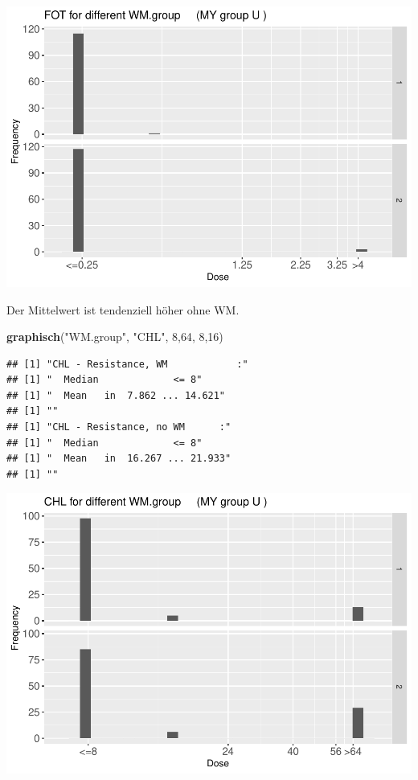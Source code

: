\documentclass[
]{article}
\newenvironment{Shaded}{\begin{snugshade}}{\end{snugshade}}
\newcommand{\DecValTok}[1]{\textcolor[rgb]{0.00,0.00,0.81}{#1}}
\newcommand{\KeywordTok}[1]{\textcolor[rgb]{0.13,0.29,0.53}{\textbf{#1}}}
\newcommand{\NormalTok}[1]{#1}
\newcommand{\StringTok}[1]{\textcolor[rgb]{0.31,0.60,0.02}{#1}}
\begin{document}
\includegraphics{Verteilungen_files/figure-latex/unnamed-chunk-38-1.pdf}

Der Mittelwert ist tendenziell höher ohne WM.

\begin{Shaded}
\begin{Highlighting}[]
  \KeywordTok{graphisch}\NormalTok{(}\StringTok{"WM.group"}\NormalTok{, }\StringTok{"CHL"}\NormalTok{, }\DecValTok{8}\NormalTok{,}\DecValTok{64}\NormalTok{, }\DecValTok{8}\NormalTok{,}\DecValTok{16}\NormalTok{) }
\end{Highlighting}
\end{Shaded}

\begin{verbatim}
## [1] "CHL - Resistance, WM            :"
## [1] "  Median             <= 8"
## [1] "  Mean   in  7.862 ... 14.621"
## [1] ""
## [1] "CHL - Resistance, no WM      :"
## [1] "  Median             <= 8"
## [1] "  Mean   in  16.267 ... 21.933"
## [1] ""
\end{verbatim}

\includegraphics{Verteilungen_files/figure-latex/unnamed-chunk-39-1.pdf}
\end{document}
